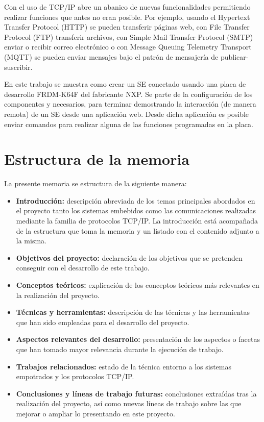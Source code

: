 Con el uso de TCP/IP abre un abanico de nuevas funcionalidades permitiendo
realizar funciones que antes no eran posible. Por ejemplo, usando el Hypertext
Transfer Protocol (HTTP) se pueden transferir páginas web, con File Transfer
Protocol (FTP) transferir archivos, con Simple Mail Transfer Protocol (SMTP)
enviar o recibir correo electrónico o con Message Queuing Telemetry Transport
(MQTT) se pueden enviar mensajes bajo el patrón de mensajería de
publicar-suscribir.

En este trabajo se muestra como crear un SE conectado usando una placa de
desarrollo FRDM-K64F del fabricante NXP. Se parte de la configuración de los
componentes  y  necesarios, para
terminar demostrando la interacción (de manera remota) de un SE desde una
aplicación web. Desde dicha aplicación es posible enviar comandos para realizar
alguna de las funciones programadas en la placa.

\section{Estructura de la memoria}\label{sec:estructura}
La presente memoria se estructura de la siguiente manera:

\begin{itemize}
\item
  \textbf{Introducción:} descripción abreviada de los temas principales 
  abordados en el proyecto tanto los sistemas embebidos como las comunicaciones
  realizadas mediante la familia de protocolos TCP/IP. La introducción está
  acompañada de la estructura que toma la memoria y un listado con el contenido
  adjunto a la misma.
\item
  \textbf{Objetivos del proyecto:} declaración de los objetivos que se pretenden
  conseguir con el desarrollo de este trabajo.
\item
  \textbf{Conceptos teóricos:} explicación de los conceptos teóricos más
  relevantes en la realización del proyecto.
\item
  \textbf{Técnicas y herramientas:} descripción de las técnicas y las
  herramientas que han sido empleadas para el desarrollo del proyecto.
\item
  \textbf{Aspectos relevantes del desarrollo:} presentación de los aspectos o
  facetas que han tomado mayor relevancia durante la ejecución de trabajo.
\item
  \textbf{Trabajos relacionados:} estado de la técnica entorno a los sistemas
  empotrados y los protocolos TCP/IP.
\item
  \textbf{Conclusiones y líneas de trabajo futuras:} conclusiones extraídas tras
  la realización del proyecto, así como nuevas líneas de trabajo sobre las que
  mejorar o ampliar lo presentando en este proyecto.
\end{itemize}

